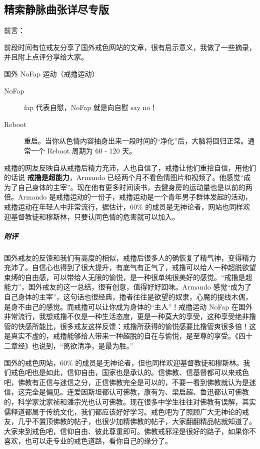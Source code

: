 \subsection{精索静脉曲张详尽专版}

前言：

前段时间有位戒友分享了国外戒色网站的文章，很有启示意义，我做了一些摘录，并且附上点评分享给大家。

国外 NoFap 运动（戒撸运动）

\begin{description}
    \item[NoFap] fap 代表自慰，NoFap 就是向自慰 say no！
    \item[Reboot] 重启。当你从色情内容抽身出来一段时间的“净化”后，大脑将回归正常。通常一个 Reboot 周期为 60 - 120 天。
\end{description}

\begin{case}[国外戒色网站摘录]
    戒撸的网友反映自从戒撸后精力充沛，人也自信了，戒撸让他们重拾自信，用他们的话说 \textbf{戒撸是超能力}，Armando 已经两个月不看色情图片和视频了。他感觉“成为了自己身体的主宰”。现在他有更多时间读书，去健身房的运动量也是以前的两倍。Armando 是戒撸运动的一份子，戒撸运动是一个青年男子群体发起的活动，戒撸运动在年轻人中非常流行，据估计，60\% 的成员是无神论者，网站也同样欢迎基督教徒和穆斯林，只要认同色情的危害就可以加入。
    \subparagraph{附评} 国外戒友的反馈和我们有高度的相似，戒撸后很多人的确恢复了精气神，变得精力充沛了。自信心也得到了很大提升，有底气有正气了，戒撸可以给人一种超脱欲望束缚的自由感，可以带给人无限的愉悦，是一种很单纯很美好的感觉。“戒撸是超能力”，国外戒友的这一总结，很有创意，值得好好回味。Armando 感觉“成为了自己身体的主宰”，这句话也很经典，撸者往往是欲望的奴隶，心魔的提线木偶，是身不由己的感觉。而戒撸可以让你成为身体的“主人”！戒撸运动 NoFap 在国外非常流行，我想戒撸不仅是一种生活态度，更是一种莫大的享受，这种享受绝非撸管的快感所能比，很多戒友这样反馈：戒撸所获得的愉悦感要比撸管爽很多倍！这是真实不虚的，戒撸能够给人带来一种超脱的自在与愉悦，是至尊的享受。《四十二章经》也说到，“离欲清净，是最为胜。”

    国外的戒色网站，60\% 的成员是无神论者，但也同样欢迎基督教徒和穆斯林。我们戒色吧也是如此，信仰自由，国家也是承认的。信佛教、信基督都可以来戒色吧，佛教有正信与迷信之分，正信佛教完全是可以的，不要一看到佛教就认为是迷信，这完全是偏见。连爱因斯坦都认可佛教，康有为、梁启超、鲁迅都认可佛教的，科学家沈家祯和潘宗光也认可佛教。现在很多中学生往往对佛教有误解，其实儒释道都属于传统文化，我们都应该好好学习。戒色吧为了照顾广大无神论的戒友，几乎不置顶佛教的帖子，也很少加精佛教的帖子，大家翻翻精品帖就知道了。大家来到戒色吧，信仰自由、彼此尊重即可。佛教戒邪淫是很好的路子，如果你不喜欢，也可以走专业的戒色道路，看你自己的缘分了。
\end{case}

